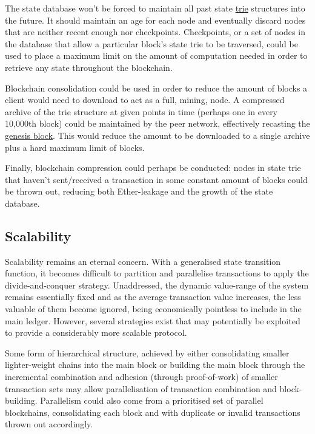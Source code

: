 \documentclass[9pt,oneside]{amsart}
\begin{document}
\begin{multicols}{2}
The state database won't be forced to maintain all past state \hyperlink{trie}{trie} structures into the future. It should maintain an age for each node and eventually discard nodes that are neither recent enough nor checkpoints. Checkpoints, or a set of nodes in the database that allow a particular block's state trie to be traversed, could be used to place a maximum limit on the amount of computation needed in order to retrieve any state throughout the blockchain.

Blockchain consolidation could be used in order to reduce the amount of blocks a client would need to download to act as a full, mining, node. A compressed archive of the trie structure at given points in time (perhaps one in every 10,000th block) could be maintained by the peer network, effectively recasting the \hyperlink{GenesisBlock}{genesis block}. This would reduce the amount to be downloaded to a single archive plus a hard maximum limit  of blocks.

Finally, blockchain compression could perhaps be conducted: nodes in state trie that haven't sent/received a transaction in some constant amount of blocks could be thrown out, reducing both Ether-leakage and the growth of the state database.

\subsection{Scalability}

Scalability remains an eternal concern. With a generalised state transition function, it becomes difficult to partition and parallelise transactions to apply the divide-and-conquer strategy. Unaddressed, the dynamic value-range of the system remains essentially fixed and as the average transaction value increases, the less valuable of them become ignored, being economically pointless to include in the main ledger. However, several strategies exist that may potentially be exploited to provide a considerably more scalable protocol.

Some form of hierarchical structure, achieved by either consolidating smaller lighter-weight chains into the main block or building the main block through the incremental combination and adhesion (through proof-of-work) of smaller transaction sets may allow parallelisation of transaction combination and block-building. Parallelism could also come from a prioritised set of parallel blockchains, consolidating each block and with duplicate or invalid transactions thrown out accordingly.


\end{multicols}
\end{document}
